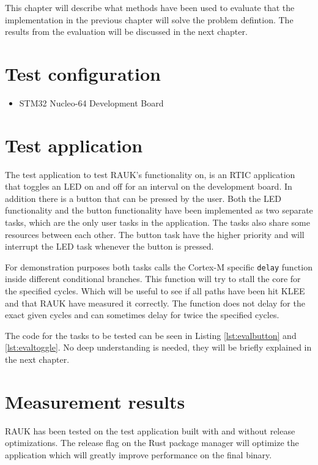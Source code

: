 This chapter will describe what methods have been used to evaluate that the
implementation in the previous chapter will solve the problem defintion. The
results from the evaluation will be discussed in the next chapter.

\section{Test configuration}
\begin{itemize}
    \item STM32 Nucleo-64 Development Board
\end{itemize}

\section{Test application}
The test application to test RAUK's functionality on, is an RTIC application
that toggles an LED on and off for an interval on the development board. In
addition there is a button that can be pressed by the user. Both the LED
functionality and the button functionality have been implemented as two
separate tasks, which are the only user tasks in the application. The tasks
also share some resources between each other. The button task have the higher
priority and will interrupt the LED task whenever the button is pressed.

For demonstration purposes both tasks calls the Cortex-M specific
\texttt{delay} function inside different conditional branches. This function
will try to stall the core for the specified cycles. Which will be useful to
see if all paths have been hit KLEE and that RAUK have measured it correctly.
The function does not delay for the exact given cycles and can sometimes delay
for twice the specified cycles.

The code for the tasks to be tested can be seen in Listing \ref{lst:evalbutton}
and \ref{lst:evaltoggle}. No deep understanding is needed, they will be
briefly explained in the next chapter.




\section{Measurement results}
RAUK has been tested on the test application built with and without release
optimizations. The release flag on the Rust package manager will optimize the
application which will greatly improve performance on the final binary.

